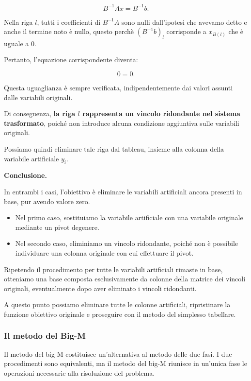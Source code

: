\begin{enumerate}
    \[
    B^{-1}Ax=B^{-1}b.
    \]

    Nella riga $l$, tutti i coefficienti di $B^{-1}A$ sono nulli dall'ipotesi che avevamo detto e anche il termine noto è nullo, questo perchè $(B^{-1}b)_l$ corrisponde a $x_{B(l)}$ che è uguale a 0.

    Pertanto, l'equazione corrispondente diventa:

    \[
    \boxed{0=0}.
    \]

    Questa uguaglianza è sempre verificata, indipendentemente dai valori assunti dalle variabili originali.

    Di conseguenza, \textbf{la riga $l$ rappresenta un vincolo ridondante nel sistema trasformato}, poiché non introduce alcuna condizione aggiuntiva sulle variabili originali.

    Possiamo quindi eliminare tale riga dal tableau, insieme alla colonna della variabile artificiale $y_i$.

\end{enumerate}

\medskip

\textbf{Conclusione.}

In entrambi i casi, l'obiettivo è eliminare le variabili artificiali ancora presenti in base, pur avendo valore zero.

\begin{itemize}
    \item Nel primo caso, sostituiamo la variabile artificiale con una variabile originale mediante un pivot degenere.
    \item Nel secondo caso, eliminiamo un vincolo ridondante, poiché non è possibile individuare una colonna originale con cui effettuare il pivot.
\end{itemize}

Ripetendo il procedimento per tutte le variabili artificiali rimaste in base, otteniamo una base composta esclusivamente da colonne della matrice dei vincoli originali, eventualmente dopo aver eliminato i vincoli ridondanti.

A questo punto possiamo eliminare tutte le colonne artificiali, ripristinare la funzione obiettivo originale e proseguire con il metodo del simplesso tabellare.

\subsubsection{Il metodo del Big-M}

Il metodo del big-M costituisce un'alternativa al metodo
delle due fasi. I due procedimenti sono equivalenti,
ma il metodo del big-M riunisce in un'unica fase
le operazioni necessarie alla risoluzione del problema.

